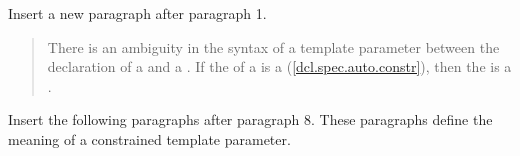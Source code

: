 Insert a new paragraph after paragraph 1.

\begin{quote}
\begin{addedblock}
\pnum
There is an ambiguity in the syntax of a template parameter between the
declaration of a  and a
.
% 
If the  of a  
is a  (\ref{dcl.spec.auto.constr}), 
then the  is a .
\end{addedblock}
\end{quote}

Insert the following paragraphs after paragraph 8. These paragraphs
define the meaning of a constrained template parameter.

